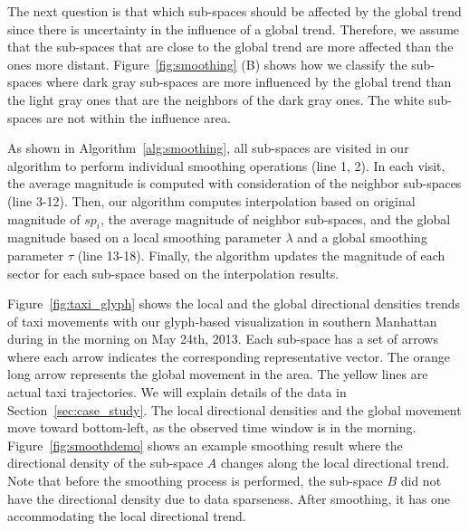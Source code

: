 The next question is that which sub-spaces should be affected by the global trend since there is uncertainty in the influence of a global trend. Therefore, we assume that the sub-spaces that are close to the global trend are more affected than the ones more distant. Figure~\ref{fig:smoothing} (B) shows how we classify the sub-spaces where dark gray sub-spaces are more influenced by the global trend than the light gray ones that are the neighbors of the dark gray ones. The white sub-spaces are not within the influence area.

As shown in Algorithm~\ref{alg:smoothing}, all sub-spaces are visited in our algorithm to perform individual smoothing operations (line 1, 2). In each visit, the average magnitude is computed with consideration of the neighbor sub-spaces (line 3-12).  
Then, our algorithm computes interpolation based on original magnitude of $sp_i$, the average magnitude of neighbor sub-spaces, and the global magnitude based on a local smoothing parameter $\lambda$ and a global smoothing parameter $\tau$ (line 13-18). Finally, the algorithm updates the magnitude of each sector for each sub-space based on the interpolation results. 

Figure~\ref{fig:taxi_glyph} shows the local and the global directional densities trends of taxi movements with our glyph-based visualization in southern Manhattan during in the morning on May 24th, 2013.
Each sub-space has a set of arrows where each arrow indicates the corresponding representative vector.
The orange long arrow represents the global movement in the area.
The yellow lines are actual taxi trajectories.
We will explain details of the data in Section~\ref{sec:case_study}.
The local directional densities and the global movement move toward bottom-left, as the observed time window is in the morning.
Figure~\ref{fig:smoothdemo} shows an example smoothing result where the directional density of the sub-space $A$ changes along the local directional trend. Note that before the smoothing process is performed, the sub-space $B$ did not have the directional density due to data sparseness. After smoothing, it has one accommodating the local directional trend.



